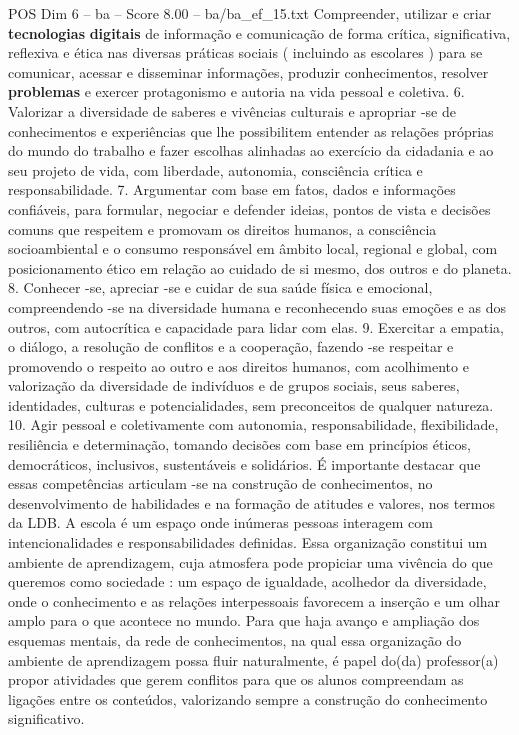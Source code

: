 \begin{textsample}{POS Dim 6 – ba – Score 8.00 – ba/ba\_ef\_15.txt}
Compreender, utilizar e criar \textbf{tecnologias} \textbf{digitais} de informação e comunicação de forma crítica, significativa, reflexiva e ética nas diversas práticas sociais ( incluindo as escolares ) para se comunicar, acessar e disseminar informações, produzir conhecimentos, resolver \textbf{problemas} e exercer protagonismo e autoria na vida pessoal e coletiva. 6.
Valorizar a diversidade de saberes e vivências culturais e apropriar -se de conhecimentos e experiências que lhe possibilitem entender as relações próprias do mundo do trabalho e fazer escolhas alinhadas ao exercício da cidadania e ao seu projeto de vida, com liberdade, autonomia, consciência crítica e responsabilidade. 7.
Argumentar com base em fatos, dados e informações confiáveis, para formular, negociar e defender ideias, pontos de vista e decisões comuns que respeitem e promovam os direitos humanos, a consciência socioambiental e o consumo responsável em âmbito local, regional e global, com posicionamento ético em relação ao cuidado de si mesmo, dos outros e do planeta. 8.
Conhecer -se, apreciar -se e cuidar de sua saúde física e emocional, compreendendo -se na diversidade humana e reconhecendo suas emoções e as dos outros, com autocrítica e capacidade para lidar com elas. 9.
Exercitar a empatia, o diálogo, a resolução de conflitos e a cooperação, fazendo -se respeitar e promovendo o respeito ao outro e aos direitos humanos, com acolhimento e valorização da diversidade de indivíduos e de grupos sociais, seus saberes, identidades, culturas e potencialidades, sem preconceitos de qualquer natureza. 10.
Agir pessoal e coletivamente com autonomia, responsabilidade, flexibilidade, resiliência e determinação, tomando decisões com base em princípios éticos, democráticos, inclusivos, sustentáveis e solidários.
É importante destacar que essas competências articulam -se na construção de conhecimentos, no desenvolvimento de habilidades e na formação de atitudes e valores, nos termos da LDB.
A escola é um espaço onde inúmeras pessoas interagem com intencionalidades e responsabilidades definidas.
Essa organização constitui um ambiente de aprendizagem, cuja atmosfera pode propiciar uma vivência do que queremos como sociedade : um espaço de igualdade, acolhedor da diversidade, onde o conhecimento e as relações interpessoais favorecem a inserção e um olhar amplo para o que acontece no mundo.
Para que haja avanço e ampliação dos esquemas mentais, da rede de conhecimentos, na qual essa organização do ambiente de aprendizagem possa fluir naturalmente, é papel do(da) professor(a) propor atividades que gerem conflitos para que os alunos compreendam as ligações entre os conteúdos, valorizando sempre a construção do conhecimento significativo.

\end{textsample}
